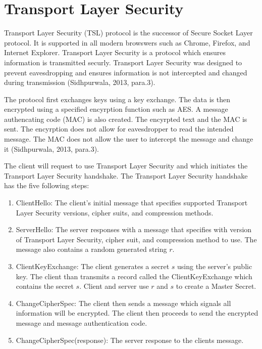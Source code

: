 \documentclass[12pt]{article}
\begin{document}
\section{Transport Layer Security}\label{sec:tls}

Transport Layer Security (TSL) protocol is the successor of Secure Socket Layer protocol. It is supported in all modern browswers such as Chrome, Firefox, and Internet Explorer. Transport Layer Security is a protocol which ensures information is transmitted securly. Transport Layer Security was designed to prevent eavesdropping and ensures information is not intercepted and changed during transmission (Sidhpurwala, 2013, para.3).

The protocol first exchanges keys using a key exchange. The data is then encrypted using a specified encyrption function such as AES. A message authencating code (MAC) is also created. The encyrpted text and the MAC is sent. The encyrption does not allow for eavesdropper to read the intended message. The MAC does not allow the user to intercept the message and change it (Sidhpurwala, 2013, para.3).

The client will request to use Transport Layer Security and which initiates the Transport Layer Security handshake. The Transport Layer Security handshake has the five following steps:
\begin{enumerate}
	\item ClientHello: The client's initial message that specifies supported Transport Layer Security versions, cipher suits, and compression methods. 
	\item ServerHello: The server responses with a message that specifies with version of Transport Layer Security, cipher suit, and compression method to use. The message also contains a random generated string $r$.
	\item ClientKeyExchange: The client generates a secret $s$ using the server's public key. The client than transmits a record called the ClientKeyExchange which contains the secret $s$. Client and server use $r$ and $s$ to create a Master Secret. 
	\item ChangeCipherSpec: The client then sends a message which signals all information will be encrypted. The client then proceeds to send the encrypted message and message authentication code. 
	\item ChangeCipherSpec(response): The server response to the clients message.
\end{enumerate}
\end{document}
